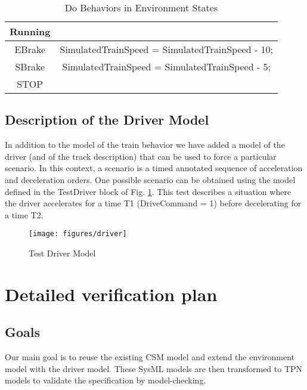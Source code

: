 \begin{table}[ht!]
  \footnotesize
  \caption{Do Behaviors in Environment States}
  \begin{center}
    \begin{tabular}{|c|c|}
      \hline    
      Running & \\
      \hline    
      EBrake & SimulatedTrainSpeed = SimulatedTrainSpeed - 10; \\
      \hline    
      SBrake & SimulatedTrainSpeed = SimulatedTrainSpeed - 5;\\
      \hline
      STOP & \\
      \hline
    \end{tabular}
  \end{center}
  \label{tab:envdo}
\end{table} 

\subsection{Description of the Driver Model}

In addition to the model of the train behavior we have added a model
of the driver (and of the track description) that can be used to force
a particular scenario. In this context, a scenario is a timed
annotated sequence of acceleration and deceleration orders. One
possible scenario can be obtained using the model defined in the
TestDriver block of Fig. \ref{fig:driver}. This test describes a
situation where the driver accelerates for a time T1 (DriveCommand =
1) before decelerating for a time T2. 

\begin{figure}[ht!]
  \centering
  \texttt{[image: figures/driver]}
  \caption{Test Driver Model}
  \label{fig:driver}
\end{figure}

\section{Detailed verification plan}

\subsection{Goals}

Our main goal is to reuse the existing CSM model and extend the environment model with the driver model. These SysML models are then transformed to TPN models to validate the specification by model-checking. 

